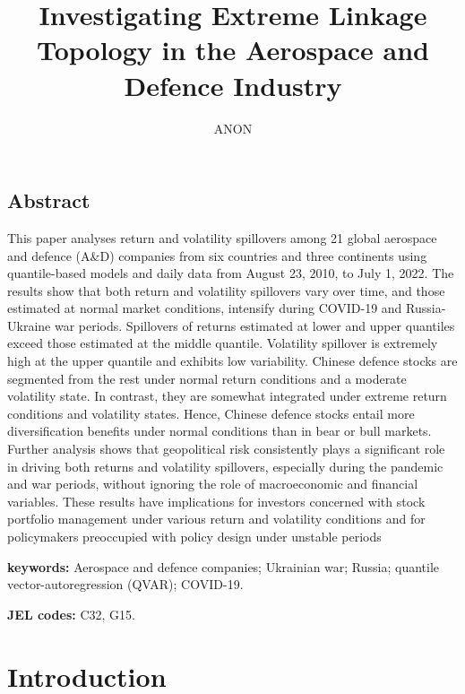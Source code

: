 \documentclass[
  letterpaper,
  DIV=11,
  numbers=noendperiod]{scrartcl}
\title{Investigating Extreme Linkage Topology in the Aerospace and
Defence Industry}
\author{ANON}
\date{}
\begin{document}
\maketitle
\ifdefined\Shaded\renewenvironment{Shaded}{\begin{tcolorbox}[sharp corners, interior hidden, enhanced, borderline west={3pt}{0pt}{shadecolor}, frame hidden, boxrule=0pt, breakable]}{\end{tcolorbox}}\fi

\hypertarget{abstract}{%
\subsection*{Abstract}\label{abstract}}

This paper analyses return and volatility spillovers among 21 global
aerospace and defence (A\&D) companies from six countries and three
continents using quantile-based models and daily data from August 23,
2010, to July 1, 2022. The results show that both return and volatility
spillovers vary over time, and those estimated at normal market
conditions, intensify during COVID-19 and Russia-Ukraine war periods.
Spillovers of returns estimated at lower and upper quantiles exceed
those estimated at the middle quantile. Volatility spillover is
extremely high at the upper quantile and exhibits low variability.
Chinese defence stocks are segmented from the rest under normal return
conditions and a moderate volatility state. In contrast, they are
somewhat integrated under extreme return conditions and volatility
states. Hence, Chinese defence stocks entail more diversification
benefits under normal conditions than in bear or bull markets. Further
analysis shows that geopolitical risk consistently plays a significant
role in driving both returns and volatility spillovers, especially
during the pandemic and war periods, without ignoring the role of
macroeconomic and financial variables. These results have implications
for investors concerned with stock portfolio management under various
return and volatility conditions and for policymakers preoccupied with
policy design under unstable periods

\textbf{keywords:} Aerospace and defence companies; Ukrainian war;
Russia; quantile vector-autoregression (QVAR); COVID-19.

\textbf{JEL codes:} C32, G15.

\hypertarget{introduction}{%
\section{Introduction}\label{introduction}}
\end{document}
